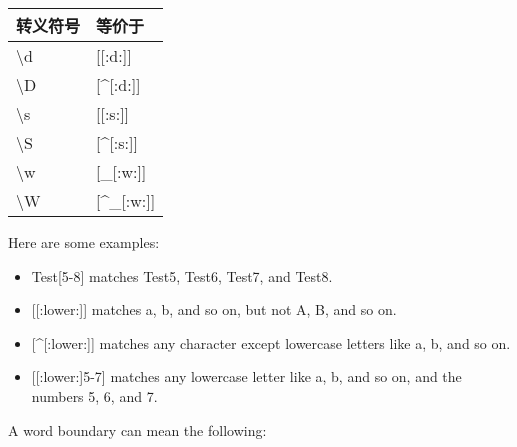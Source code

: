 \begin{longtable}{|l|l|}
\hline
\textbf{转义符号} & \textbf{等价于}              \\ \hline
\endfirsthead
%
\endhead
%
\textbackslash{}d        & {[}{[}:d:{]}{]}                     \\ \hline
\textbackslash{}D        & {[}\textasciicircum{}{[}:d:{]}{]}   \\ \hline
\textbackslash{}s        & {[}{[}:s:{]}{]}                     \\ \hline
\textbackslash{}S        & {[}\textasciicircum{}{[}:s:{]}{]}   \\ \hline
\textbackslash{}w        & {[}\_{[}:w:{]}{]}                   \\ \hline
\textbackslash{}W        & {[}\textasciicircum{}\_{[}:w:{]}{]} \\ \hline
\end{longtable}

Here are some examples:

\begin{itemize}
\item
Test[5-8] matches Test5, Test6, Test7, and Test8.

\item
{}[[:lower:]] matches a, b, and so on, but not A, B, and so on.

\item
{}[\^{}[:lower:]] matches any character except lowercase letters like a, b, and so on.

\item
{}[[:lower:]5-7] matches any lowercase letter like a, b, and so on, and the numbers 5, 6, and 7.
\end{itemize}


A word boundary can mean the following:

